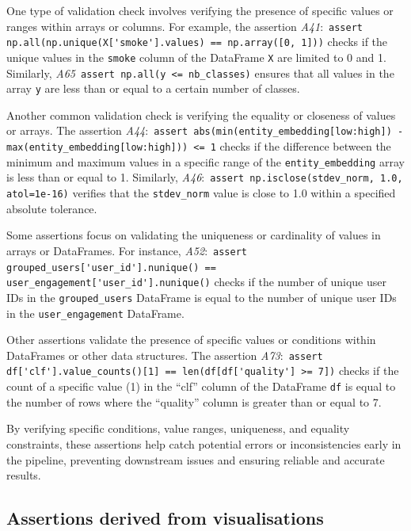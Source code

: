 One type of validation check involves verifying the presence of specific values or ranges within arrays or columns. For example, the assertion \emph{A41}:~\lstinline{assert np.all(np.unique(X['smoke'].values) == np.array([0, 1]))} checks if the unique values in the \texttt{smoke} column of the DataFrame \texttt{X} are limited to 0 and 1. Similarly, \emph{A65}~\lstinline{assert np.all(y <= nb_classes)} ensures that all values in the array \texttt{y} are less than or equal to a certain number of classes.

Another common validation check is verifying the equality or closeness of values or arrays. The assertion \emph{A44}:~\lstinline{assert abs(min(entity_embedding[low:high]) - max(entity_embedding[low:high])) <= 1} checks if the difference between the minimum and maximum values in a specific range of the \texttt{entity\_embedding} array is less than or equal to 1. Similarly, \emph{A46}:~\lstinline{assert np.isclose(stdev_norm, 1.0, atol=1e-16)} verifies that the \texttt{stdev\_norm} value is close to 1.0 within a specified absolute tolerance.

Some assertions focus on validating the uniqueness or cardinality of values in arrays or DataFrames. For instance, \emph{A52}:~\lstinline{assert grouped_users['user_id'].nunique() == user_engagement['user_id'].nunique()} checks if the number of unique user IDs in the \texttt{grouped\_users} DataFrame is equal to the number of unique user IDs in the \texttt{user\_engagement} DataFrame.

Other assertions validate the presence of specific values or conditions within DataFrames or other data structures. The assertion \emph{A73}:~\lstinline{assert df['clf'].value_counts()[1] == len(df[df['quality'] >= 7])} checks if the count of a specific value (1) in the ``clf'' column of the DataFrame \texttt{df} is equal to the number of rows where the ``quality'' column is greater than or equal to 7.

By verifying specific conditions, value ranges, uniqueness, and equality constraints, these assertions help catch potential errors or inconsistencies early in the pipeline, preventing downstream issues and ensuring reliable and accurate results.


\subsection{Assertions derived from visualisations}


